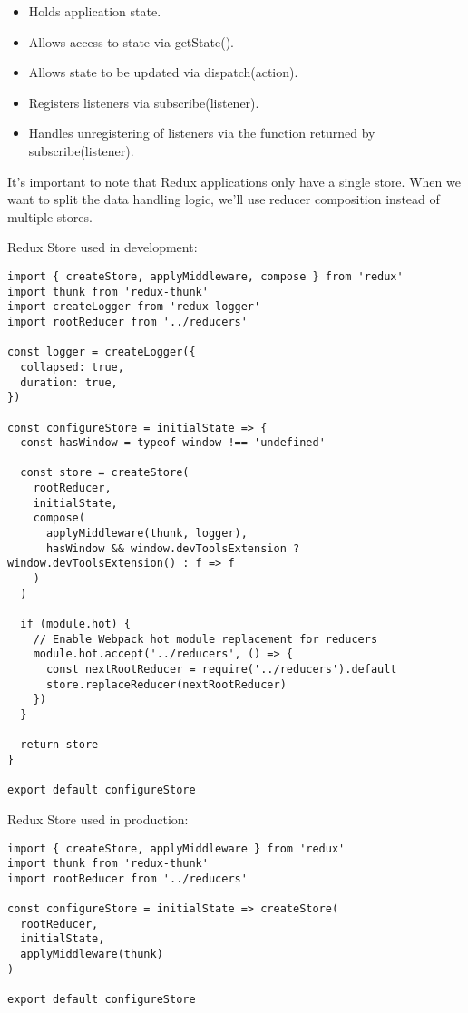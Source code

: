 \begin{itemize}
\item{Holds application state.}
\item{Allows access to state via getState().}
\item{Allows state to be updated via dispatch(action).}
\item{Registers listeners via subscribe(listener).}
\item{Handles unregistering of listeners via the function returned by subscribe(listener).}
\end{itemize}

It's important to note that Redux applications only have a single store. When we want to split the data handling logic, we'll use reducer composition instead of multiple stores.

Redux Store used in development:


\begin{lstlisting}
import { createStore, applyMiddleware, compose } from 'redux'
import thunk from 'redux-thunk'
import createLogger from 'redux-logger'
import rootReducer from '../reducers'

const logger = createLogger({
  collapsed: true,
  duration: true,
})

const configureStore = initialState => {
  const hasWindow = typeof window !== 'undefined'

  const store = createStore(
    rootReducer,
    initialState,
    compose(
      applyMiddleware(thunk, logger),
      hasWindow && window.devToolsExtension ? window.devToolsExtension() : f => f
    )
  )

  if (module.hot) {
    // Enable Webpack hot module replacement for reducers
    module.hot.accept('../reducers', () => {
      const nextRootReducer = require('../reducers').default
      store.replaceReducer(nextRootReducer)
    })
  }

  return store
}

export default configureStore
\end{lstlisting}

Redux Store used in production:


\begin{lstlisting}
import { createStore, applyMiddleware } from 'redux'
import thunk from 'redux-thunk'
import rootReducer from '../reducers'

const configureStore = initialState => createStore(
  rootReducer,
  initialState,
  applyMiddleware(thunk)
)

export default configureStore
\end{lstlisting}

